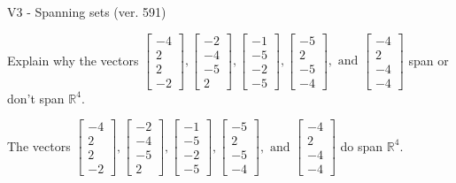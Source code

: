\begin{exercise}
  \begin{exerciseTitle}V3 - Spanning sets (ver. 591)\end{exerciseTitle}
  \begin{exerciseStatement}
    Explain why the vectors \(\left[\begin{array}{r}
-4 \\
2 \\
2 \\
-2
\end{array}\right] , \left[\begin{array}{r}
-2 \\
-4 \\
-5 \\
2
\end{array}\right] , \left[\begin{array}{r}
-1 \\
-5 \\
-2 \\
-5
\end{array}\right] , \left[\begin{array}{r}
-5 \\
2 \\
-5 \\
-4
\end{array}\right] , \text{ and } \left[\begin{array}{r}
-4 \\
2 \\
-4 \\
-4
\end{array}\right]\) span or don't span \(\mathbb{R}^4\). 
	


  \end{exerciseStatement}
  \begin{exerciseAnswer}
   The vectors \(\left[\begin{array}{r}
-4 \\
2 \\
2 \\
-2
\end{array}\right] , \left[\begin{array}{r}
-2 \\
-4 \\
-5 \\
2
\end{array}\right] , \left[\begin{array}{r}
-1 \\
-5 \\
-2 \\
-5
\end{array}\right] , \left[\begin{array}{r}
-5 \\
2 \\
-5 \\
-4
\end{array}\right] , \text{ and } \left[\begin{array}{r}
-4 \\
2 \\
-4 \\
-4
\end{array}\right]\) 
  	 do  
	span \(\mathbb{R}^4\).
  



\end{exerciseAnswer}
\end{exercise}
